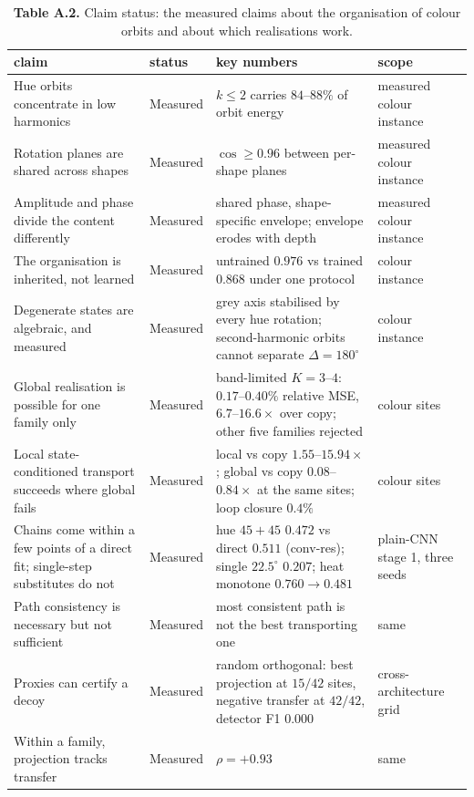 \begin{table}[t]
\centering
\small
\caption*{\textbf{Table A.2.} Claim status: the measured claims about the organisation of colour orbits and about which realisations work.}
\begin{tabularx}{\textwidth}{@{}>{\raggedright\arraybackslash}X >{\raggedright\arraybackslash}X >{\raggedright\arraybackslash}X >{\raggedright\arraybackslash}X@{}}
\toprule
\textbf{claim} & \textbf{status} & \textbf{key numbers} & \textbf{scope} \\
\midrule
Hue orbits concentrate in low harmonics & Measured & $k\le2$ carries $84$--$88\%$ of orbit energy & measured colour instance \\
Rotation planes are shared across shapes & Measured & $\cos\ge0.96$ between per-shape planes & measured colour instance \\
Amplitude and phase divide the content differently & Measured & shared phase, shape-specific envelope; envelope erodes with depth & measured colour instance \\
The organisation is inherited, not learned & Measured & untrained $0.976$ vs trained $0.868$ under one protocol & colour instance \\
Degenerate states are algebraic, and measured & Measured & grey axis stabilised by every hue rotation; second-harmonic orbits cannot separate $\Delta=180^\circ$ & colour instance \\
Global realisation is possible for one family only & Measured & band-limited $K=3$--$4$: $0.17$--$0.40\%$ relative MSE, $6.7$--$16.6\times$ over copy; other five families rejected & colour sites \\
Local state-conditioned transport succeeds where global fails & Measured & local vs copy $1.55$--$15.94\times$; global vs copy $0.08$--$0.84\times$ at the same sites; loop closure $0.4\%$ & colour sites \\
Chains come within a few points of a direct fit; single-step substitutes do not & Measured & hue $45{+}45$ $0.472$ vs direct $0.511$ (conv-res); single $22.5^\circ$ $0.207$; heat monotone $0.760\to0.481$ & plain-CNN stage 1, three seeds \\
Path consistency is necessary but not sufficient & Measured & most consistent path is not the best transporting one & same \\
Proxies can certify a decoy & Measured & random orthogonal: best projection at $15/42$ sites, negative transfer at $42/42$, detector F1 $0.000$ & cross-architecture grid \\
Within a family, projection tracks transfer & Measured & $\rho=+0.93$ & same \\
\bottomrule
\end{tabularx}
\end{table}


